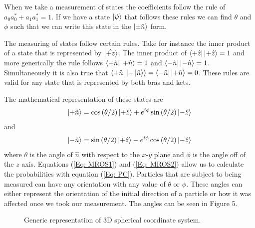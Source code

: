 \documentclass[twocolumn]{article}
\begin{document}
When we take a measurement of states the coefficients follow the rule of $a_0a_0^*+a_1a_1^*=1$. If we have a state $\ket{\psi}$ that follows these rules we can find $\theta$ and $\phi$ such that we can write this state in the $\ket{\pm\hat{n}}$ form. 

The measuring of states follow certain rules. Take for instance the inner product of a state that is represented by $\ket{\hat{+z}}$. The inner product of $\bra{+\hat{z}}\ket{+\hat{z}}=1$ and more generically the rule follows $\bra{+\hat{n}}\ket{+\hat{n}}=1$ and $\bra{-\hat{n}}\ket{-\hat{n}}=1$. Simultaneously it is also true that $\bra{+\hat{n}}\ket{-\ket{\hat{n}}}=\bra{-\hat{n}}\ket{+\hat{n}}=0$. These rules are valid for any state that is represented by both bras and kets.

The mathematical representation of these states are 
\begin{equation} \label{Eq: MROS1}
\ket{+\hat{n}}=\cos{(\theta/2)}\ket{+\hat{z}}+e^{i\phi}\sin{(\theta/2)}\ket{-\hat{z}}
\end{equation}
and
\begin{equation} \label{Eq: MROS2}
\ket{-\hat{n}}=\sin{(\theta/2)}\ket{+\hat{z}}-e^{i\phi}\cos{(\theta/2)}\ket{-\hat{z}}
\end{equation}
where $\theta$ is the angle of $\hat{n}$ with respect to the $x$-$y$ plane and $\phi$ is the angle off of the $z$ axis. Equations (\ref{Eq: MROS1}) and (\ref{Eq: MROS2}) allow us to calculate the probabilities with equation (\ref{Eq: PC}). Particles that are subject to being measured can have any orientation with any value of $\theta$ or $\phi$. These angles can either represent the orientation of the initial direction of a particle or how it was affected once we took our measurement. The angles can be seen in Figure 5.
\begin{figure}[ht]
    \centering
    \caption{\footnotesize{Generic representation of 3D spherical coordinate system.}}
    \label{Fig: 3DCS}
\end{figure}
\end{document}
